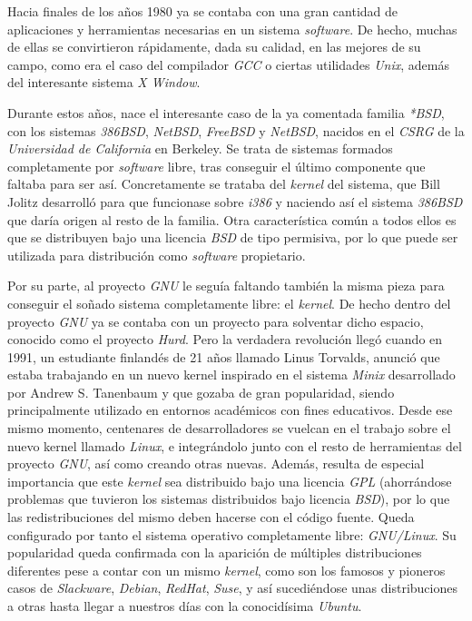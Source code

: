Hacia finales de los años 1980 ya se contaba con una gran cantidad de
aplicaciones y herramientas necesarias en un sistema \textit{software}. De
hecho, muchas de ellas se convirtieron rápidamente, dada su calidad, en las
mejores de su campo, como era el caso del compilador \textit{GCC} o ciertas
utilidades \textit{Unix}, además del interesante sistema \textit{X Window}.

Durante estos años, nace el interesante caso de la ya comentada familia
\textit{*BSD}, con los sistemas \textit{386BSD}, \textit{NetBSD},
\textit{FreeBSD} y \textit{NetBSD}, nacidos en el \textit{CSRG} de la
\textit{Universidad de California} en Berkeley. Se trata de sistemas formados
completamente por \textit{software} libre, tras conseguir el último componente
que faltaba para ser así. Concretamente se trataba del \textit{kernel} del
sistema, que Bill Jolitz desarrolló para que funcionase sobre \textit{i386} y
naciendo así el sistema \textit{386BSD} que daría origen al resto de la familia.
Otra característica común a todos ellos es que se distribuyen bajo una licencia
\textit{BSD} de tipo permisiva, por lo que puede ser utilizada para
distribución como \textit{software} propietario.

Por su parte, al proyecto \textit{GNU} le seguía faltando también la misma pieza
para conseguir el soñado sistema completamente libre: el \textit{kernel}. De
hecho dentro del proyecto \textit{GNU} ya se contaba con un proyecto para
solventar dicho espacio, conocido como el proyecto \textit{Hurd}. Pero la
verdadera revolución llegó cuando en 1991, un estudiante finlandés de 21 años
llamado Linus Torvalds, anunció que estaba trabajando en un nuevo kernel
inspirado en el sistema \textit{Minix} desarrollado por Andrew S. Tanenbaum y
que gozaba de gran popularidad, siendo principalmente utilizado en entornos
académicos con fines educativos. Desde ese mismo momento, centenares de
desarrolladores se vuelcan en el trabajo sobre el nuevo kernel llamado
\textit{Linux}, e integrándolo junto con el resto de herramientas del proyecto
\textit{GNU}, así como creando otras nuevas. Además, resulta de especial
importancia que este \textit{kernel} sea distribuido bajo una licencia
\textit{GPL} (ahorrándose problemas que tuvieron los sistemas distribuidos bajo
licencia \textit{BSD}), por lo que las redistribuciones del mismo deben hacerse
con el código fuente. Queda configurado por tanto el sistema operativo
completamente libre: \textit{GNU/Linux}. Su popularidad queda confirmada con la
aparición de múltiples distribuciones diferentes pese a contar con un mismo
\textit{kernel}, como son los famosos y pioneros casos de \textit{Slackware},
\textit{Debian}, \textit{RedHat}, \textit{Suse}, y así sucediéndose unas
distribuciones a otras hasta llegar a nuestros días con la conocidísima
\textit{Ubuntu}.

